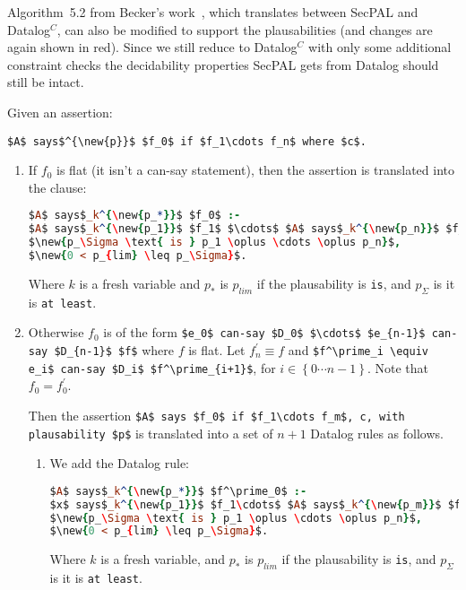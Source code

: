 \documentclass[a4paper]{scrartcl}
\newcommand{\new}[1]{{\color{BrickRed}#1}}
\begin{document}
Algorithm~5.2 from Becker's work~\cite{becker_secpal:_2010}, which translates
between SecPAL and Datalog$^C$, can also be modified to support the
plausabilities (and changes are again shown in red).  Since we still reduce to
Datalog$^C$ with only some additional constraint checks the decidability
properties SecPAL gets from Datalog should still be intact.

Given an assertion:
\begin{center} \lstinline!$A$ says$^{\new{p}}$ $f_0$ if $f_1\cdots f_n$ where $c$.! \end{center}

\begin{enumerate}
\item
  If $f_0$ is flat (it isn't a can-say statement), then the assertion is translated into the clause:
  \begin{lstlisting}[language=Prolog]
$A$ says$_k^{\new{p_*}}$ $f_0$ :-
$A$ says$_k^{\new{p_1}}$ $f_1$ $\cdots$ $A$ says$_k^{\new{p_n}}$ $f_n$, c,
$\new{p_\Sigma \text{ is } p_1 \oplus \cdots \oplus p_n}$,
$\new{0 < p_{lim} \leq p_\Sigma}$.
  \end{lstlisting}
  Where $k$ is a fresh variable \new{and $p_*$ is $p_{lim}$ if the plausability is \texttt{is}, and $p_\Sigma$ is it is \texttt{at least}}.

\item
  Otherwise $f_0$ is of the form \lstinline!$e_0$ can-say $D_0$ $\cdots$ $e_{n-1}$ can-say $D_{n-1}$ $f$! where $f$ is flat.
  Let $f^\prime_n \equiv f$ and \lstinline!$f^\prime_i \equiv e_i$ can-say $D_i$ $f^\prime_{i+1}$!, for $i\in\left\{0\cdots n-1\right\}$.
  Note that $f_0 = f^\prime_0$.

  Then the assertion \lstinline!$A$ says $f_0$ if $f_1\cdots f_m$, c, with plausability $p$! is translated into a set of $n+1$ Datalog rules as follows.

  \begin{enumerate}
  \item
    We add the Datalog rule:
    \begin{lstlisting}[language=Prolog]
$A$ says$_k^{\new{p_*}}$ $f^\prime_0$ :-
$x$ says$_k^{\new{p_1}}$ $f_1\cdots$ $A$ says$_k^{\new{p_m}}$ $f_m$, c,
$\new{p_\Sigma \text{ is } p_1 \oplus \cdots \oplus p_n}$,
$\new{0 < p_{lim} \leq p_\Sigma}$.
    \end{lstlisting}
    Where $k$ is a fresh variable, \new{and $p_*$ is $p_{lim}$ if the plausability is \texttt{is}, and $p_\Sigma$ is it is \texttt{at least}}.


\end{enumerate}
\end{enumerate}
\end{document}
